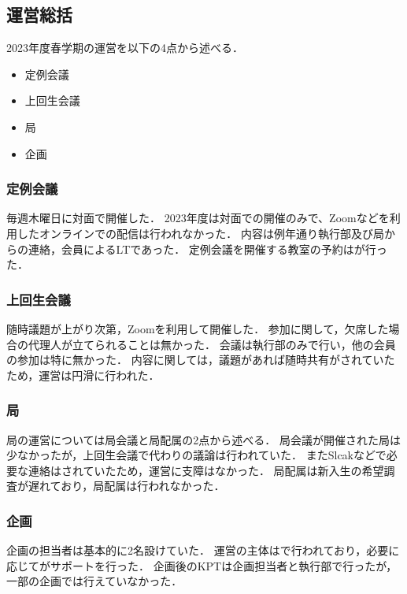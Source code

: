 \subsection*{運営総括}


2023年度春学期の運営を以下の4点から述べる．
\begin{itemize}
    \item 定例会議
    \item 上回生会議
    \item 局
    \item 企画
\end{itemize}

\subsubsection*{定例会議}
毎週木曜日に対面で開催した．
2023年度は対面での開催のみで、Zoomなどを利用したオンラインでの配信は行われなかった．
内容は例年通り執行部及び局からの連絡，会員によるLTであった．
定例会議を開催する教室の予約は\kensuiChief{}が行った．

\subsubsection*{上回生会議}
随時議題が上がり次第，Zoomを利用して開催した．
参加に関して，欠席した場合の代理人が立てられることは無かった．
会議は執行部のみで行い，他の会員の参加は特に無かった．
内容に関しては，議題があれば随時共有がされていたため，運営は円滑に行われた．

\subsubsection*{局}
局の運営については局会議と局配属の2点から述べる．
局会議が開催された局は少なかったが，上回生会議で代わりの議論は行われていた．
またSlcakなどで必要な連絡はされていたため，運営に支障はなかった．
局配属は新入生の希望調査が遅れており，局配属は行われなかった．

\subsubsection*{企画}
企画の担当者は基本的に2名設けていた．
運営の主体は\secondGrade{}で行われており，必要に応じて\thirdGrade{}がサポートを行った．
企画後のKPTは企画担当者と執行部で行ったが，一部の企画では行えていなかった．
